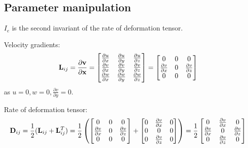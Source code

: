 \subsection{Parameter manipulation}
$I_e$ is the second invariant of the rate of deformation tensor.

Velocity gradients:
\setlength{\extrarowheight}{0.5\baselineskip}
\begin{equation}
  \mathbf{L}_{ij} = \frac{\partial {\bf v}}{\partial {\bf x}} =
  \begin{bmatrix}
    \partial u \over \partial x &
    \partial u \over \partial y &
    \partial u \over \partial z \\
    \partial v \over \partial x &
    \partial v \over \partial y &
    \partial v \over \partial z \\
    \partial w \over \partial x &
    \partial w \over \partial y &
    \partial w \over \partial z
  \end{bmatrix}
  =
  \begin{bmatrix}
    0 & 0 & 0 \\
    \partial v \over \partial x & 0 & \partial v \over \partial z \\
    0 & 0 & 0
  \end{bmatrix}
\end{equation}
as $u = 0, w = 0, \frac{\partial v}{\partial y} = 0$.

Rate of deformation tensor:
\begin{equation}
  \mathbf{D}_{ij} = \frac{1}{2} (\mathbf{L}_{ij} + \mathbf{L}_{ij}^T) = \frac{1}{2} \left(
  \begin{bmatrix}
    0 & 0 & 0 \\
    \partial v \over \partial x & 0 & \partial v \over \partial z \\
    0 & 0 & 0
  \end{bmatrix}
  +
  \begin{bmatrix}
    0 & \partial v \over \partial x & 0 \\
    0 & 0 & 0 \\
    0 & \partial v \over \partial z & 0
  \end{bmatrix}
  \right)
  = \frac{1}{2}
  \begin{bmatrix}
    0 & \partial v \over \partial x & 0 \\
    \partial v \over \partial x & 0 & \partial v \over \partial z \\
    0 & \partial v \over \partial z & 0
  \end{bmatrix}
\end{equation}

